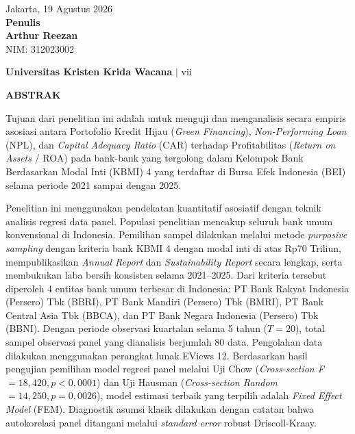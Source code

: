 \documentclass[12pt,a4paper]{article}
\newcommand{\ukrida}{Universitas Kristen Krida Wacana}
\newcommand{\nahamahasiswa}{Arthur Reezan}
\newcommand{\nim}{312023002}
\numberwithin{equation}{section}
\begin{document}
\vspace{0.8cm}
\begin{flushright}
  Jakarta, 19 Agustus 2026\\[0.3cm]
  \textbf{Penulis}\\[1.8cm]
  \textbf{\nahamahasiswa}\\
  NIM: \nim
\end{flushright}

\vfill
\begin{flushright}
  \footnotesize\textbf{\ukrida} $|$ vii
\end{flushright}

\newpage
\thispagestyle{frontmatter}
\begin{center}
  {\large\bfseries ABSTRAK}
\end{center}

\vspace{0.4cm}
\noindent
Tujuan dari penelitian ini adalah untuk menguji dan menganalisis secara empiris asosiasi antara Portofolio Kredit Hijau (\emph{Green Financing}), \emph{Non-Performing Loan} (NPL), dan \emph{Capital Adequacy Ratio} (CAR) terhadap Profitabilitas (\emph{Return on Assets} / ROA) pada bank-bank yang tergolong dalam Kelompok Bank Berdasarkan Modal Inti (KBMI) 4 yang terdaftar di Bursa Efek Indonesia (BEI) selama periode 2021 sampai dengan 2025.

\noindent
Penelitian ini menggunakan pendekatan kuantitatif asosiatif dengan teknik analisis regresi data panel. Populasi penelitian mencakup seluruh bank umum konvensional di Indonesia. Pemilihan sampel dilakukan melalui metode \emph{purposive sampling} dengan kriteria bank KBMI 4 dengan modal inti di atas Rp70 Triliun, mempublikasikan \emph{Annual Report} dan \emph{Sustainability Report} secara lengkap, serta membukukan laba bersih konsisten selama 2021--2025. Dari kriteria tersebut diperoleh 4 entitas bank umum terbesar di Indonesia: PT Bank Rakyat Indonesia (Persero) Tbk (BBRI), PT Bank Mandiri (Persero) Tbk (BMRI), PT Bank Central Asia Tbk (BBCA), dan PT Bank Negara Indonesia (Persero) Tbk (BBNI). Dengan periode observasi kuartalan selama 5 tahun ($T=20$), total sampel observasi panel yang dianalisis berjumlah 80 data. Pengolahan data dilakukan menggunakan perangkat lunak EViews 12. Berdasarkan hasil pengujian pemilihan model regresi panel melalui Uji Chow (\emph{Cross-section F} $= 18{,}420, p < 0{,}0001$) dan Uji Hausman (\emph{Cross-section Random} $= 14{,}250, p = 0{,}0026$), model estimasi terbaik yang terpilih adalah \emph{Fixed Effect Model} (FEM). Diagnostik asumsi klasik dilakukan dengan catatan bahwa autokorelasi panel ditangani melalui \emph{standard error} robust Driscoll-Kraay.
\end{document}
